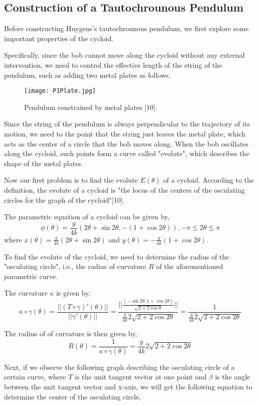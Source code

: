 \documentclass{article}
\begin{document}
 \subsection{Construction of a Tautochrounous Pendulum}
	Before constructing Huygens’s tautochrounous pendulum, we first explore some important properties of the cycloid. 
	\par Specifically, since the bob cannot move along the cycloid without any external intervention, we need to control the effective length of the string of the pendulum, such as adding two metal plates as follows.
\begin{figure}[H]
\centering
\texttt{[image: P1Plate.jpg]}
\caption{Pendulum constrained by metal plates [10].}
\label{g1}
\end{figure}
	\par Since the string of the pendulum is always perpendicular to the trajectory of its motion, we need to the point that the string just leaves the metal plate, which acts as the center of a circle that the bob moves along. When the bob oscillates along the cycloid, such points form a curve called "evolute", which describes the shape of the metal plates.
	\par Now our first problem is to find the evolute $E(\theta)$ of a cycloid. According to the definition, the evolute of a cycloid is "the locus of the centers of the osculating circles for the graph of the cycloid"[10].
	\par The parametric equation of a cycloid can be given by,
	$$\phi(\theta)=\frac{g}{4k}(2\theta+\sin2\theta,-(1+\cos2\theta)),-\pi\le2\theta\le\pi$$
	where $x(\theta)=\frac{g}{4k}(2\theta+\sin2\theta)$ and $y(\theta)=-\frac{g}{4k}(1+\cos2\theta)$.
	\par To find the evolute of the cycloid, we need to determine the radius of the "osculating circle", i.e., the radius of curvature $R$ of the aforementioned parametric curve.
	\par The curvature $\kappa$ is given by,
	$$\kappa\circ\gamma(\theta)=\frac{||(T\circ\gamma)'(\theta)||}{||\gamma'(\theta)||}=\frac{||\frac{(-\sin2\theta,1+\cos2\theta)}{\sqrt{2+2\cos\theta}}||}{\frac{g}{4k}2\sqrt{2+2\cos2\theta}}=\frac{1}{\frac{g}{4k}2\sqrt{2+2\cos2\theta}}$$
	\par The radius of of curvature is then given by,
	$$R(\theta)=\frac{1}{\kappa\circ\gamma(\theta)}=\frac{g}{4k}2\sqrt{2+2\cos2\theta}$$
	\par Next, if we observe the following graph describing the osculating circle of a certain curve, where $T$ is the unit tangent vector at one point and $\beta$ is the angle between the unit tangent vector and x-axis, we will get the following equation to determine the center of the osculating circle,
\end{document}

